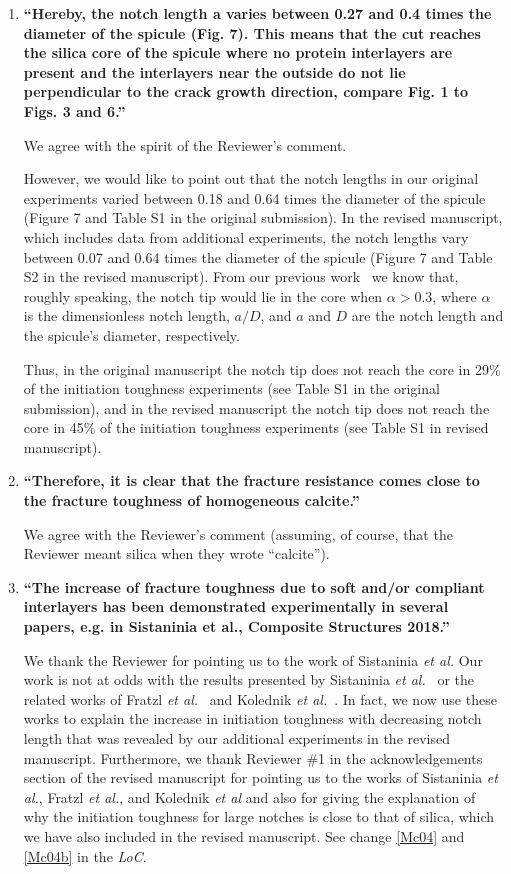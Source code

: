 \documentclass[11pt,letterpaper]{report}
\begin{document}
\begin{enumerate}[label=\textit{1.\arabic*},wide, labelwidth=!, labelindent=0pt]
\item \label{r1c3} {\bf ``Hereby, the notch length a varies between 0.27 and 0.4 times the diameter of the spicule (Fig. 7). This means that the cut reaches the silica core of the spicule where no protein interlayers are present and the interlayers near the outside do not lie perpendicular to the crack growth direction, compare Fig. 1 to Figs. 3 and 6.''}

We agree with the spirit of the Reviewer's comment.

However, we would like to point out that the notch lengths in our original experiments varied between 0.18 and 0.64 times the diameter of the spicule (Figure 7 and Table S1 in the original submission). In the revised manuscript, which includes data from additional experiments, the notch lengths vary between 0.07 and 0.64 times the diameter of the spicule (Figure 7 and Table S2 in the revised manuscript). From our previous work~\cite{monn2015new} we know that, roughly speaking, the notch tip would lie in the core when $\alpha>0.3$, where $\alpha$ is the dimensionless notch length, $a/D$, and $a$ and $D$ are the notch length and the spicule's diameter, respectively.  

Thus, in the original manuscript the notch tip does not reach the core in 29\% of the initiation toughness experiments (see Table S1 in the original submission), and in the revised manuscript the notch tip does not reach the core in 45\% of the initiation toughness experiments (see Table S1 in revised manuscript).

\item \label{r1c5} {\bf ``Therefore, it is clear that the fracture resistance comes close to the fracture toughness of homogeneous calcite.''}

We agree with the Reviewer's comment (assuming, of course, that the Reviewer meant silica when they wrote ``calcite'').

\item \label{r1c6} {\bf ``The increase of fracture toughness due to soft and/or compliant interlayers has been demonstrated experimentally in several papers, e.g. in Sistaninia et al., Composite Structures 2018.''}


We thank the Reviewer for pointing us to the work of Sistaninia \textit{et al.} Our work is not at odds with the results presented by Sistaninia \textit{et al.}~\cite{sistaninia2018design} or the related works of Fratzl \textit{et al.}~\cite{fratzl2007hindered} and Kolednik \textit{et al.}~\cite{kolednik2014improvements,kolednik2011bioinspired}. In fact, we now use these works to explain  the increase in initiation toughness with decreasing notch length that was revealed by our additional experiments  in the revised  manuscript.  Furthermore, we thank Reviewer \#1 in the acknowledgements section of the revised manuscript for pointing us to the works of Sistaninia \textit{et al.},  Fratzl \textit{et al.}, and Kolednik \textit{et al} and also for giving the explanation of why the initiation toughness for large notches is close to that of silica, which we have also included in the revised manuscript. See change \ref{Mc04} and \ref{Mc04b} in the \textit{LoC}.


\end{enumerate}
\end{document}
